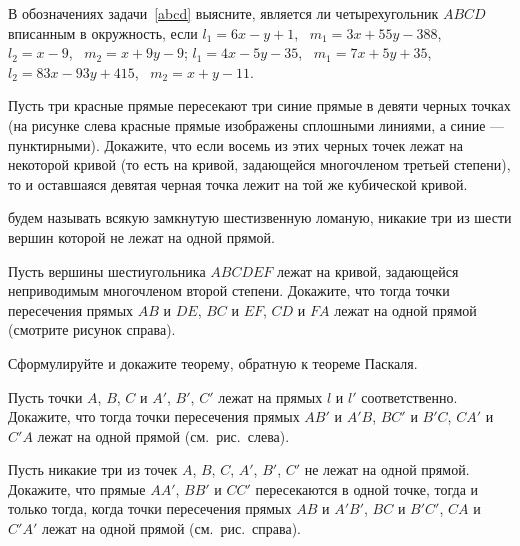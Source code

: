 \documentclass[a4paper,11pt]{article}
\begin{document}
 В обозначениях задачи~\ref{abcd} выясните, является ли четырехугольник
$ABCD$ вписанным в окружность, если
 $l_1=6x-y+1$, \ $m_1=3x+55y-388$, \ $l_2=x-9$, \ $m_2=x+9y-9$;
 $l_1=4x-5y-35$, \ $m_1=7x+5y+35$, \ $l_2=83x-93y+415$, \ $m_2=x+y-11$.


{
  Пусть три красные прямые пересекают
три синие прямые в девяти черных
точках
(на рисунке слева красные прямые изображены сплошными
линиями, а синие --- пунктирными).
Докажите, что если восемь из этих черных точек
лежат на некоторой  кривой
(то есть на кривой, задающейся многочленом третьей степени),
то и оставшаяся девятая черная точка  лежит на той же кубической кривой.
}


  \/ будем называть всякую замкнутую шестизвенную
ломаную, никакие три из шести вершин которой не лежат на одной прямой.

{
 Пусть вершины шестиугольника
$ABCDEF$
лежат на кривой, задающейся неприводимым многочленом второй степени.
Докажите, что тогда
точки пересечения прямых $AB$ и $DE$, $BC$ и $EF$, $CD$ и $FA$
лежат на одной прямой
(смотрите рисунок справа).
}


  Сформулируйте и докажите теорему, обратную к теореме Паскаля.


{
 Пусть точки $A$, $B$, $C$ и $A'$, $B'$, $C'$
лежат на прямых $l$ и $l'$ соответственно.
Докажите, что тогда точки пересечения прямых
$AB'$ и $A'B$, $BC'$ и $B'C$, $CA'$ и $C'A$ лежат на одной прямой
(см.~рис.~слева).
}


{
 Пусть никакие три из точек $A$, $B$, $C$,
$A'$, $B'$, $C'$ не лежат на одной прямой.
Докажите, что прямые $AA'$, $BB'$
и $CC'$ пересекаются в одной точке,
тогда и только тогда, когда точки пересечения прямых $AB$ и $A'B'$,
$BC$ и $B'C'$, $CA$ и $C'A'$ лежат на одной прямой (см.~рис.~справа).
}
\end{document}

